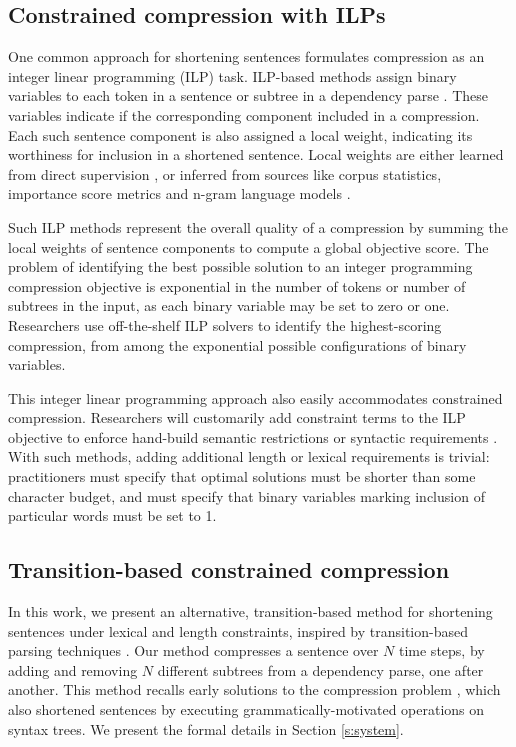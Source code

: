 \documentclass[11pt,a4paper]{article}
\begin{document}
\subsection{Constrained compression with ILPs}\label{s:ilps}

One common approach for shortening sentences formulates compression as an integer linear programming (ILP) task. ILP-based methods assign binary variables to each token in a sentence \cite{clarke2008global} or subtree in a dependency parse \cite{filippova2008dependency}. These variables indicate if the corresponding component included in a compression. Each such sentence component is also assigned a local weight, indicating its worthiness for inclusion in a shortened sentence. Local weights are either learned from direct supervision \cite{filippova2013overcoming,Wang2017CanSH}, or inferred from sources like corpus statistics, importance score metrics and n-gram language models \cite{clarke2008global,filippova2008dependency}.

Such ILP methods represent the overall quality of a compression by summing the local weights of sentence components to compute a global objective score.  The problem of identifying the best possible solution to an integer programming compression objective is exponential in the number of tokens or number of subtrees in the input, as each binary variable may be set to zero or one. Researchers use off-the-shelf ILP solvers to identify the highest-scoring compression, from among the exponential possible configurations of binary variables.

This integer linear programming approach also easily accommodates constrained compression. Researchers will customarily add constraint terms to the ILP objective to enforce hand-build semantic restrictions \cite{clarke2008global} or syntactic requirements \cite{filippova2008dependency}. With such methods, adding additional length or lexical requirements is trivial: practitioners must specify that optimal solutions must be shorter than some character budget, and must specify that binary variables marking inclusion of particular words must be set to 1. 

\subsection{Transition-based constrained compression}

In this work, we present an alternative, transition-based method for shortening sentences under lexical and length constraints, inspired by transition-based parsing techniques \cite{Earley1970AnEC,nivre2003}. Our method compresses a sentence over $N$ time steps, by adding and removing $N$ different subtrees from a dependency parse, one after another. This method recalls early solutions to the compression problem \cite{Jing2000SentenceRF,Knight2000StatisticsBasedS}, which also shortened sentences by executing grammatically-motivated operations on syntax trees. We present the formal details in Section \ref{s:system}. 
\end{document}
